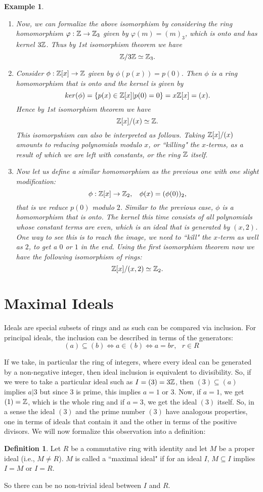 \documentclass[12pt]{article}
\theoremstyle{plain}
\newtheorem{example}{Example}
\theoremstyle{definition}
\newtheorem{definition}{Definition}
\theoremstyle{remark}
\begin{document}
\begin{example}
\begin{enumerate}
    \item Now, we can formalize the above isomorphism by considering the ring homomorphism $\varphi:\mathbb{Z}\rightarrow \mathbb{Z}_3$ given by $\varphi(m) = (m)_3$, which is onto and has kernel $3\mathbb{Z}$. Thus by 1st isomorphism theorem we have
    $$\mathbb{Z}/3\mathbb{Z} \simeq \mathbb{Z}_3.$$
    \item Consider $\phi:\mathbb{Z}[x]\rightarrow \mathbb{Z}$ given by $\phi(p(x)) = p(0)$. Then $\phi$ is a ring homomorphism that is onto and the kernel is given by 
    $$ker(\phi) = \{p(x) \in \mathbb{Z}[x]|p(0)=0\} = x\mathbb{Z}[x] = (x).$$
    Hence by 1st isomorphism theorem we have 
    $$\mathbb{Z}[x]/(x) \simeq \mathbb{Z}.$$
    This isomorpshism can also be interpreted as follows. Taking $\mathbb{Z}[x]/(x)$ amounts to reducing polynomials modulo $x$, or ``killing" the $x$-terms, as a result of which we are left with constants, or the ring $\mathbb{Z}$ itself. 
    \item Now let us define a similar homomorphism as the previous one with one slight modification:
    $$\phi:\mathbb{Z}[x]\rightarrow \mathbb{Z}_2, \:\:\:\: \phi(x) = (\phi(0))_2,$$
    that is we reduce $p(0)$ modulo $2$. 
    Similar to the previous case, $\phi$ is a homomorphism that is onto. The kernel this time consists of all polynomials whose constant terms are even, which is an ideal that is generated by $(x,2)$. One way to see this is to reach the image, we need to ``kill" the $x$-term as well as $2$, to get a $0$ or $1$ in the end. 
    Using the first isomorphism theorem now we have the following isomorphism of rings:
    $$\mathbb{Z}[x]/(x,2) \simeq \mathbb{Z}_2.$$
    
\end{enumerate}
\end{example}

\section{Maximal Ideals}
Ideals are special subsets of rings and as such can be compared via inclusion. For principal ideals, the inclusion can be described in terms of the generators:
$$(a) \subseteq (b) \Leftrightarrow a \in (b) \Leftrightarrow a=br, \:\:\:r\in R$$

If we take, in particular the ring of integers, where every ideal can be generated by a non-negative integer, then ideal inclusion is equivalent to divisibility. So, if we were to take a particular ideal such as $I = (3) = 3\mathbb{Z}$, then $(3)\subseteq (a)$ implies $a|3$ but since $3$ is prime, this implies $a=1$ or $3$. Now, if $a=1$, we get $(1)=\mathbb{Z}$, which is the whole ring and if $a=3$, we get the ideal $(3)$ itself. So, in a sense the ideal $(3)$ and the prime number $(3)$ have analogous properties, one in terms of ideals that contain it and the other in terms of the positive divisors. We will now formalize this observation into a definition:
\begin{definition}
Let $R$ be a commutative ring with identity and let $M$ be a proper ideal (i.e., $M \neq R$). $M$ is called a ``maximal ideal" if for an ideal $I$, $M\subseteq I$ implies $I=M$ or $I=R$.    
\end{definition}
So there can be no non-trivial ideal between $I$ and $R$. 
\end{document}
